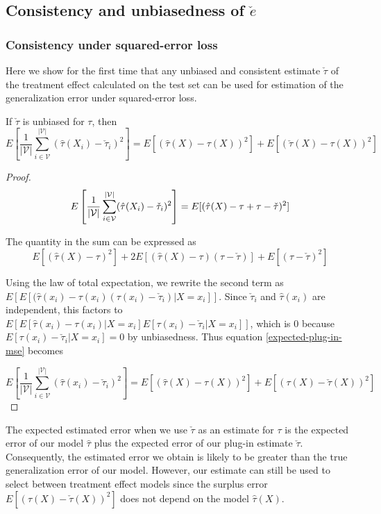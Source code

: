 \subsection{Consistency and unbiasedness of $\check e$}

\subsubsection{Consistency under squared-error loss}

Here we show for the first time that any unbiased and consistent estimate $\check\tau$ of the treatment effect calculated on the test set can be used for estimation of the generalization error under squared-error loss. 

\begin{lemma}
If $\check\tau$ is unbiased for $\tau$, then 
\[
E\left[\frac{1}{|\mathcal{V}|}\sum_{i \in \mathcal{V}}^{|\mathcal{V}|}  (\hat \tau(X_i) - \check \tau_i)^2\right] = E[(\hat\tau(X) - \tau(X))^2] + E[(\check\tau(X) - \tau(X))^2]
\]
\end{lemma}

\begin{proof}
\begin{equation}
	E\left[ \frac{1}{|\mathcal{V}|}\sum_{i \in \mathcal{V}}^{|\mathcal{V}|}  (\hat \tau(X_i) - \check \tau_i)^2 \right]  
	= 
	E[ (\hat \tau(X) - \tau + \tau  - \check \tau)^2 ] \\
\label{expected-plug-in-mse}
\end{equation}

The quantity in the sum can be expressed as
\[
E[ (\hat \tau(X) - \tau)^2] + 2E[(\hat \tau(X) - \tau)(\tau - \check\tau)] + E[(\tau - \check\tau)^2]
\]

Using the law of total expectation, we rewrite the second term as $E[E[(\hat \tau(x_i) - \tau(x_i)(\tau(x_i) - \check\tau_i)|X=x_i]]$. Since $\check\tau_i$ and $\hat\tau(x_i)$ are independent, this factors to $E[E[\hat \tau(x_i) - \tau(x_i)|X=x_i]E[\tau(x_i) - \check\tau_i|X=x_i]]$, which is $0$ because $E[\tau(x_i) - \check\tau_i|X=x_i] = 0$ by unbiasedness. Thus equation \ref{expected-plug-in-mse} becomes

\[
	E\left[ \frac{1}{|\mathcal{V}|}\sum_{i \in \mathcal{V}}^{|\mathcal{V}|}  (\hat \tau(x_i) - \check \tau_i)^2 \right]  
	=
	E[ (\hat \tau(X) - \tau(X))^2] + E[(\tau(X) - \check\tau(X))^2]
\]

\end{proof}

The expected estimated error when we use $\check\tau$ as an estimate for $\tau$ is the expected error of our model $\hat\tau$ plus the expected error of our plug-in estimate $\check\tau$. Consequently, the estimated error we obtain is likely to be greater than the true generalization error of our model. However, our estimate can still be used to select between treatment effect models since the surplus error $E[(\tau(X) - \check\tau(X))^2]$ does not depend on the model $\hat \tau(X)$. 

